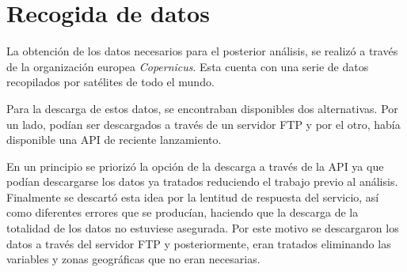 


\begin{comment}
Este apartado pretende recoger los aspectos más interesantes del desarrollo del proyecto, comentados por los autores del mismo.
Debe incluir desde la exposición del ciclo de vida utilizado, hasta los detalles de mayor relevancia de las fases de análisis, diseño e implementación.
Se busca que no sea una mera operación de copiar y pegar diagramas y extractos del código fuente, sino que realmente se justifiquen los caminos de solución que se han tomado, especialmente aquellos que no sean triviales.
Puede ser el lugar más adecuado para documentar los aspectos más interesantes del diseño y de la implementación, con un mayor hincapié en aspectos tales como el tipo de arquitectura elegido, los índices de las tablas de la base de datos, normalización y desnormalización, distribución en ficheros3, reglas de negocio dentro de las bases de datos (EDVHV GH GDWRV DFWLYDV), aspectos de desarrollo relacionados con el WWW...
Este apartado, debe convertirse en el resumen de la experiencia práctica del proyecto, y por sí mismo justifica que la memoria se convierta en un documento útil, fuente de referencia para los autores, los tutores y futuros alumnos.
\end{comment}


\section{Recogida de datos}
La obtención de los datos necesarios para el posterior análisis, se realizó a través de la organización europea \emph{Copernicus}. Esta cuenta con una serie de datos recopilados por satélites de todo el mundo.

Para la descarga de estos datos, se encontraban disponibles dos alternativas. Por un lado, podían ser descargados a través de un servidor FTP y por el otro, había disponible una API de reciente lanzamiento.

En un principio se priorizó la opción de la descarga a través de la API ya que podían descargarse los datos ya tratados reduciendo el trabajo previo al análisis. Finalmente se descartó esta idea por la lentitud de respuesta del servicio, así como diferentes errores que se producían, haciendo que la descarga de la totalidad de los datos no estuviese asegurada. Por este motivo se descargaron los datos a través del servidor FTP y posteriormente, eran tratados eliminando las variables y zonas geográficas que no eran necesarias.

